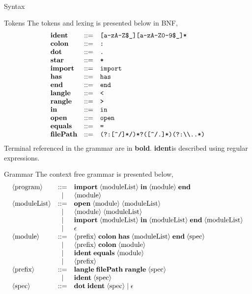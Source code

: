 \documentclass[11pt]{article}
\newcommand\DOT{\textbf{dot}}
\newcommand\COLON{\textbf{colon}}
\newcommand\STAR{\textbf{star}}
\newcommand\IDENT{\textbf{ident}}
\newcommand\HAS{\textbf{has}}
\newcommand\IMPORT{\textbf{import}}
\newcommand\END{\textbf{end}}
\newcommand\LANGLE{\textbf{langle}}
\newcommand\RANGLE{\textbf{rangle}}
\newcommand\IN{\textbf{in}}
\newcommand\OPEN{\textbf{open}}
\newcommand\EQ{\textbf{equals}}
\newcommand\FILEPATH{\textbf{filePath}}
\newcommand\nonterm[1]{\langle\textnormal{#1}\rangle}
\begin{document}
\begin{section}{Syntax}
\begin{subsection}{Tokens}
The tokens and lexing is presented below in BNF, 
\[
\begin{array}{lcl}
\IDENT & ::= & \verb|[a-zA-Z$_][a-zA-Z0-9$_]*|\\
\COLON & ::= & \verb|:|\\
\DOT & ::= & \verb|.|\\
\STAR & ::= & \verb|*|\\
\IMPORT & ::= &\verb|import|\\
\HAS & ::= & \verb|has|\\
\END & ::= &\verb|end|\\
\LANGLE & ::= &\verb|<|\\
\RANGLE & ::= &\verb|>|\\
\IN & ::= &\verb|in|\\
\OPEN & ::= &\verb|open|\\
\EQ & ::= &\verb|=|\\
\FILEPATH & ::= &\verb"(?:[^/]*/)*?([^/.]*)(?:\\..*)"
\end{array}
\]
Terminal referenced in the grammar are in \textbf{bold}. \IDENT\;is described using regular expressions.\\
\end{subsection}
\begin{subsection}{Grammar}
The context free grammar is presented below,
\[
\begin{array}{lcl}
\nonterm{program} & ::= & \IMPORT\;\nonterm{moduleList}\;\IN\;\nonterm{module}\;\END\\
& | & \nonterm{module}\\ 
\nonterm{moduleList} & ::=  & \OPEN\;\nonterm{module}\;\nonterm{moduleList}\\
& | & \nonterm{module}\;\nonterm{moduleList}\\
& | & \IMPORT\;\nonterm{moduleList}\;\IN\;\nonterm{moduleList}\;\END\;\nonterm{moduleList}\\
& | & \epsilon\\
\nonterm{module} & ::= & \nonterm{prefix}\;\COLON\;\HAS\;\nonterm{moduleList}\;\END\;\nonterm{spec}\\
& | & \nonterm{prefix}\;\COLON\;\nonterm{module}\\
& | & \IDENT\;\EQ\;\nonterm{module}\\
& | & \nonterm{prefix}\\
\nonterm{prefix} & ::= & \LANGLE\;\FILEPATH\;\RANGLE\;\nonterm{spec}\\
& | & \IDENT\;\nonterm{spec}\\
\nonterm{spec} & ::= & \DOT\;\IDENT\;\nonterm{spec}\;|\;\epsilon
\end{array}
\]


\end{subsection}
\end{section}
\end{document}
